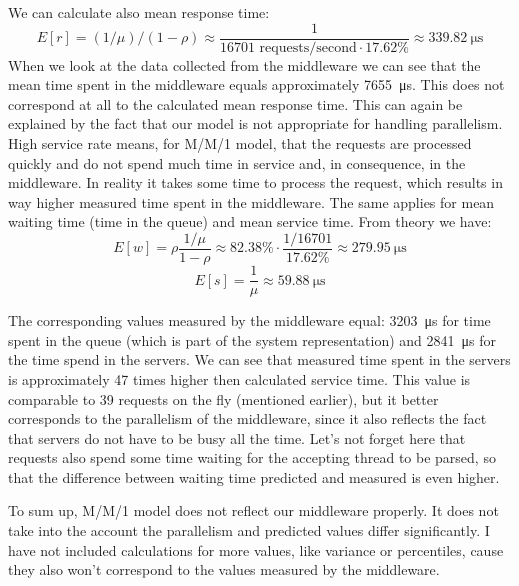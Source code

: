 \documentclass[11pt]{article}
\begin{document}

We can calculate also mean response time:
$$E[r] = (1/\mu)/(1 - \rho) \approx \frac{1}{16701 \textrm{ requests/second} \cdot 17.62\%} \approx \SI{339.82}{\micro\second}$$
When we look at the data collected from the middleware we can see that the mean time spent in the middleware equals approximately \SI{7655}{\micro\second}. This does not correspond at all to the calculated mean response time. This can again be explained by the fact that our model is not appropriate for handling parallelism. High service rate means, for M/M/1 model, that the requests are processed quickly and do not spend much time in service and, in consequence, in the middleware. In reality it takes some time to process the request, which results in way higher measured time spent in the middleware. The same applies for mean waiting time (time in the queue) and mean service time. From theory we have:
$$E[w] = \rho \frac{1/\mu}{1 - \rho} \approx 82.38\% \cdot \frac{1/16701}{17.62\%} \approx \SI{279.95}{\micro\second}$$
$$E[s] = \frac{1}{\mu} \approx \SI{59.88}{\micro\second}$$

The corresponding values measured by the middleware equal: \SI{3203}{\micro\second} for time spent in the queue (which is part of the system representation) and \SI{2841}{\micro\second} for the time spend in the servers. We can see that measured time spent in the servers is approximately 47 times higher then calculated service time. This value is comparable to 39 requests on the fly (mentioned earlier), but it better corresponds to the parallelism of the middleware, since it also reflects the fact that servers do not have to be busy all the time. Let's not forget here that requests also spend some time waiting for the accepting thread to be parsed, so that the difference between waiting time predicted and measured is even higher.

To sum up, M/M/1 model does not reflect our middleware properly. It does not take into the account the parallelism and predicted values differ significantly. I have not included calculations for more values, like variance or percentiles, cause they also won't correspond to the values measured by the middleware.
\end{document}

